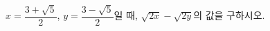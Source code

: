 \hspace*{2mm}\begin{minipage}[t]{\dimexpr\linewidth-2mm\relax}\vspace{0pt}
$x=\dfrac{3+\sqrt{5}}{2}$, $y=\dfrac{3-\sqrt{5}}{2}$일 때, $\sqrt{2x}-\sqrt{2y}$의 값을 구하시오.\end{minipage}
